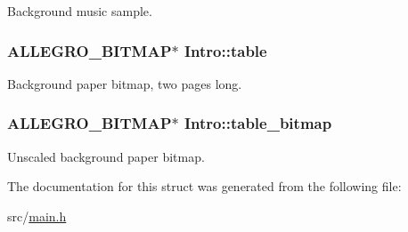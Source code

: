 \-Background music sample. \hypertarget{structIntro_a342227f3940dba9ed6b5d3bb4579fd48}{
\subsubsection[{table}]{\setlength{\rightskip}{0pt plus 5cm}\-A\-L\-L\-E\-G\-R\-O\-\_\-\-B\-I\-T\-M\-A\-P$\ast$ {\bf \-Intro\-::table}}}\label{structIntro_a342227f3940dba9ed6b5d3bb4579fd48}
\-Background paper bitmap, two pages long. \hypertarget{structIntro_a77ea358d1f44d69e5477f5dedfc9fd2b}{
\subsubsection[{table\-\_\-bitmap}]{\setlength{\rightskip}{0pt plus 5cm}\-A\-L\-L\-E\-G\-R\-O\-\_\-\-B\-I\-T\-M\-A\-P$\ast$ {\bf \-Intro\-::table\-\_\-bitmap}}}\label{structIntro_a77ea358d1f44d69e5477f5dedfc9fd2b}
\-Unscaled background paper bitmap. 

\-The documentation for this struct was generated from the following file\-:\begin{DoxyCompactItemize}
\item 
src/\hyperlink{main_8h}{main.\-h}\end{DoxyCompactItemize}
